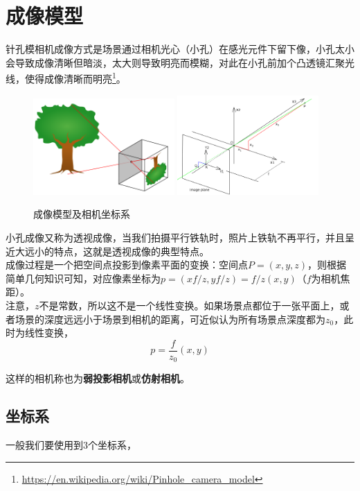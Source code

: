 \documentclass[hpyerref,UTF8,a4paper,titlepage,12pt,oneside]{ctexbook}
\theoremstyle{definition}
\begin{document}
\section{成像模型}
	针孔模相机成像方式是场景通过相机光心（小孔）在感光元件下留下像，小孔太小会导致成像清晰但暗淡，太大则导致明亮而模糊，对此在小孔前加个凸透镜汇聚光线，使得成像清晰而明亮\footnote{\url{https://en.wikipedia.org/wiki/Pinhole_camera_model}}。

	\begin{figure}[H]
		\begin{center}
			\includegraphics[width=0.48\textwidth]{images/pinhole.png}
			\includegraphics[width=0.48\textwidth]{images/pinhole_coor.png}
		\end{center}
		\caption{成像模型及相机坐标系}
	\end{figure}

	小孔成像又称为透视成像，当我们拍摄平行铁轨时，照片上铁轨不再平行，并且呈近大远小的特点，这就是透视成像的典型特点。\\

	成像过程是一个把空间点投影到像素平面的变换：空间点$P=(x,y,z)$，则根据简单几何知识可知，对应像素坐标为$p = (xf/z, yf/z) = f/z(x,y)$（$f$为相机焦距）。\\
	
	注意，$z$不是常数，所以这不是一个线性变换。如果场景点都位于一张平面上，或者场景的深度远远小于场景到相机的距离，可近似认为所有场景点深度都为$z_0$，此时为线性变换，
	$$
		p = \frac{f}{z_0}(x,y)
	$$

	这样的相机称也为\textbf{弱投影相机}或\textbf{仿射相机}。

\subsection{坐标系}
	一般我们要使用到3个坐标系，
\end{document}
